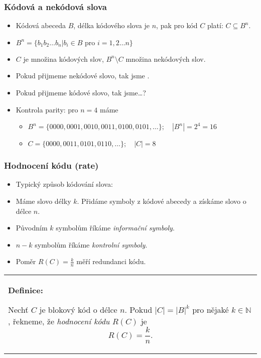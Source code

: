 \documentclass{beamer}
\newenvironment{definice}
{
    \begin{center}
    \begin{tabular}{p{9cm}}
    \textbf{Definice:}
}
{
    \end{tabular}
    \end{center}
}
\newenvironment{itemize4}%
  {\large \begin{itemize}%
    \setlength{\itemsep}{4pt}%
    \setlength{\parskip}{4pt}}%
  {\end{itemize}}
\newenvironment{itemizey}%
  {\large \begin{itemize}%
    \setlength{\itemsep}{6pt}%
    \setlength{\parskip}{6pt}}%
  {\end{itemize}}
\begin{document}
\begin{frame}[t,fragile]\frametitle{Kódová a nekódová slova} 
    \begin{itemizey}
        \item Kódová abeceda $B$, délka kódového slova je $n$, pak pro kód $C$ platí: $C\subseteq B^n$.
        \item $B^n=\{b_1b_2\dots b_n|b_i\in B \mbox{ pro } i = 1,2\dots n\}$
        \item $C$ je množina kódových slov, $B^n\setminus C$ množina nekódových slov.
        \item Pokud přijmeme nekódové slovo, tak jsme .
        \item Pokud přijmeme kódové slovo, tak jsme\dots?
        \item Kontrola parity: pro $n=4$ máme 
            \begin{itemize}
                \item $B^n=\{0000, 0001, 0010, 0011, 0100, 0101, \dots\}; \quad |B^n|=2^4=16$
                \item $C=\{0000, 0011, 0101, 0110, \dots\}; \quad |C|=8$
            \end{itemize}
    \end{itemizey}
\end{frame}



\begin{frame}[t,fragile]\frametitle{Hodnocení kódu (rate)} 
    \begin{itemize4}
        \item Typický způsob kódování slova:
        \item Máme slovo délky $k$. Přidáme symboly z kódové abecedy a získáme slovo o délce $n$.
        \item Původním $k$ symbolům říkáme \textit{informační symboly}.
        \item $n-k$ symbolům říkáme \textit{kontrolní symboly}.
        \item Poměr $R(C)=\frac{k}{n}$ měří redundanci kódu.
    \end{itemize4}

    \begin{definice}
    Nechť $C$ je blokový kód o délce $n$. Pokud $|C|=|B|^k$ pro nějaké $k\in\mathbb{N}$, řekneme, že \textit{hodnocení kódu} $R(C)$ je
    $$
    R(C) = \frac{k}{n}.
    $$
    \end{definice}
\end{frame}
\end{document}
